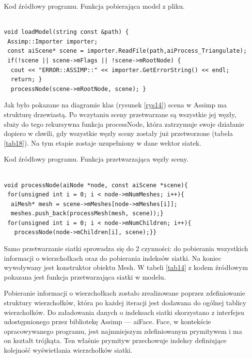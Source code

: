 \begin{table}[H]
\caption{Kod źródłowy programu. Funkcja pobierająca model z pliku.}
\label{tab13}
\begin{lstlisting}[frame=single]  % Start your code-block

void loadModel(string const &path) {
 Assimp::Importer importer;
 const aiScene* scene = importer.ReadFile(path,aiProcess_Triangulate);
 if(!scene || scene->mFlags || !scene->mRootNode) {
  cout << "ERROR::ASSIMP::" << importer.GetErrorString() << endl;
  return; }
  processNode(scene->mRootNode, scene); }
\end{lstlisting}
\end{table}

Jak było pokazane na diagramie klas (rysunek \ref{rys14}) scena w Assimp ma strukturę drzewiastą. Po wczytaniu sceny przetwarzane są wszystkie jej węzły, służy do tego rekursywna funkcja processNode, która zatrzymuje swoje działanie dopiero w chwili, gdy wszystkie węzły sceny zostały już przetworzone (tabela \ref{tab18}). Na tym etapie zostaje uzupełniony w dane wektor siatek.

\begin{table}[H]
\caption{Kod źródłowy programu. Funkcja przetwarzająca węzły sceny.}
\label{tab18}
\begin{lstlisting}[frame=single]  % Start your code-block

void processNode(aiNode *node, const aiScene *scene){
 for(unsigned int i = 0; i < node->mNumMeshes; i++){
  aiMesh* mesh = scene->mMeshes[node->mMeshes[i]];
  meshes.push_back(processMesh(mesh, scene));}
 for(unsigned int i = 0; i < node->mNumChildren; i++){
   processNode(node->mChildren[i], scene);}}
\end{lstlisting}
\end{table}

Samo przetwarzanie siatki sprowadza się do 2 czynności: do pobierania wszystkich informacji o wierzchołkach oraz do pobierania indeksów siatki. Na koniec wywoływany jest konstruktor obiektu Mesh. W tabeli \ref{tab14} z kodem źródłowym pokazana jest funkcja przetwarzająca siatki w modelu.

Pobieranie informacji o wierzchołkach zostało zrealizowane poprzez zdefiniowanie struktury wierzchołków, która po każdej iteracji jest dodawana do ogólnej tablicy wierzchołków. Do załadowania danych o indeksach siatki skorzystano z interfejsu udostępnionego przez bibliotekę Assimp --- aiFace. Face, w kontekście opracowywanego programu, jest najmniejszym zdefiniowanym prymitywem i ma on kształt trójkąta. Ten właśnie prymityw przechowuje indeksy definiujące kolejność wyświetlania wierzchołków siatki.

